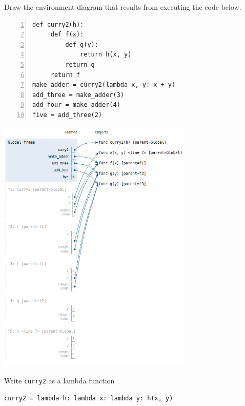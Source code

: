 \question Draw the environment diagram that results from executing the
code below.

\begin{lstlisting}[numbers=left, numberfirstline=false]
def curry2(h):
	 def f(x):
		 def g(y):
			 return h(x, y)
		 return g
	 return f
make_adder = curry2(lambda x, y: x + y)
add_three = make_adder(3)
add_four = make_adder(4)
five = add_three(2)
\end{lstlisting}

\begin{solution}
\begin{center}
\includegraphics[width=0.7\textwidth]{curry.png}
\end{center}
\end{solution}

\newpage
\question Write \texttt{curry2} as a lambda function

\begin{solution}
\begin{lstlisting}
curry2 = lambda h: lambda x: lambda y: h(x, y)
\end{lstlisting}
\end{solution}

\bigskip
